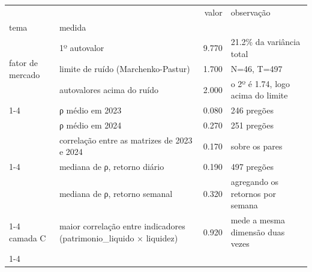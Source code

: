 \begin{tabular}{llrl}
\toprule
 &  & valor & observação \\
tema & medida &  &  \\
\midrule
\multirow[t]{3}{*}{fator de mercado} & 1º autovalor & 9.770 & 21.2\% da variância total \\
 & limite de ruído (Marchenko-Pastur) & 1.700 & N=46, T=497 \\
 & autovalores acima do ruído & 2.000 & o 2º é 1.74, logo acima do limite \\
\cline{1-4}
\multirow[t]{3}{*}{regime} & ρ médio em 2023 & 0.080 & 246 pregões \\
 & ρ médio em 2024 & 0.270 & 251 pregões \\
 & correlação entre as matrizes de 2023 e 2024 & 0.170 & sobre os pares \\
\cline{1-4}
\multirow[t]{2}{*}{frequência} & mediana de ρ, retorno diário & 0.190 & 497 pregões \\
 & mediana de ρ, retorno semanal & 0.320 & agregando os retornos por semana \\
\cline{1-4}
camada C & maior correlação entre indicadores (patrimonio\_liquido × liquidez) & 0.920 & mede a mesma dimensão duas vezes \\
\cline{1-4}
\bottomrule
\end{tabular}
